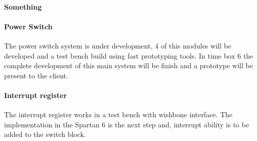 \paragraph{Something}
\paragraph{Power Switch}
The power switch system is under development, 4 of this modules will be developed and a test bench build using fast prototyping tools. In time box 6 the complete development of this main system will be finish and a prototype will be present to the client.
\paragraph{Interrupt register}
The interrupt register works in a test bench with wishbone interface. The implementation in the Spartan 6 is the next step and, interrupt ability is to be added to the switch block.
